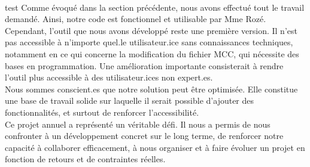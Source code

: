 \\
test
Comme évoqué dans la section précédente, nous avons effectué tout le travail demandé.
Ainsi, notre code est fonctionnel et utilisable par Mme Rozé. 
\\
Cependant, l'outil que nous avons développé reste une première version.
Il n’est pas accessible à n’importe quel.le utilisateur.ice sans connaissances techniques, notamment en ce qui concerne la modification du fichier MCC, qui nécessite des bases en programmation. 
Une amélioration importante consisterait à rendre l’outil plus accessible à des utilisateur.ices non expert.es.
\\
Nous sommes conscient.es que notre solution peut être optimisée.
Elle constitue une base de travail solide sur laquelle il serait possible d’ajouter des fonctionnalités, et surtout de renforcer l’accessibilité.
\\
Ce projet annuel a représenté un véritable défi. 
Il nous a permis de nous confronter à un développement concret sur le long terme, de renforcer notre capacité à collaborer efficacement, à nous organiser et à faire évoluer un projet en fonction de retours et de contraintes réelles.
